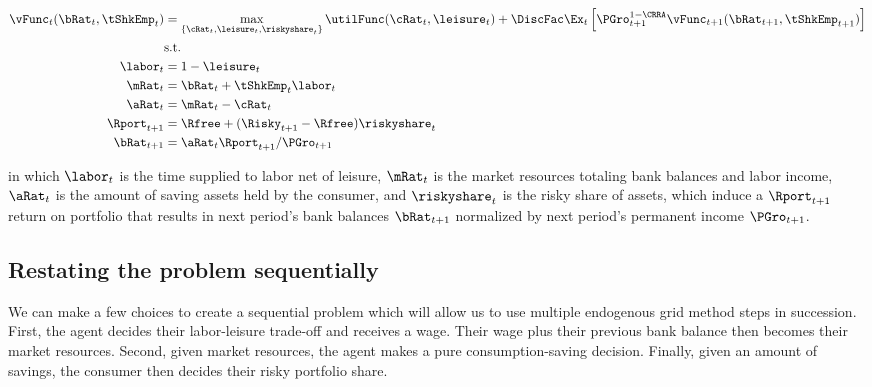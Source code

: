 \documentclass[\econtexRoot/SequentialEGM]{subfiles}
\begin{document}
\begin{equation}
	\begin{split}
		\vFunc_{t}(\bRat_{t}, \tShkEmp_{t}) & = \max_{\{\cRat_{t},
			\leisure_{t}, \riskyshare_{t}\}} \utilFunc(\cRat_{t}, \leisure_{t}) +
		\DiscFac \Ex_{t} \left[ \PGro_{t+1}^{1-\CRRA}
			\vFunc_{t+1} (\bRat_{t+1},
			\tShkEmp_{t+1}) \right] \\
		& \text{s.t.} \\
		\labor_{t} & = 1 - \leisure_{t} \\
		\mRat_{t} & = \bRat_{t} + \tShkEmp_{t}\labor_{t} \\
		\aRat_{t} & = \mRat_{t} - \cRat_{t} \\
		\Rport_{t+1} & = \Rfree + (\Risky_{t+1} - \Rfree)
		\riskyshare_{t} \\
		\bRat_{t+1} & = \aRat_{t} \Rport_{t+1} / \PGro_{t+1}
	\end{split}
\end{equation}

in which $\labor_{t}$ is the time supplied to labor net of leisure, $\mRat_{t}$ is the market resources totaling bank balances and labor income, $\aRat_{t}$ is the amount of saving assets held by the consumer, and $\riskyshare_{t}$ is the risky share of assets, which induce a $\Rport_{t+1}$ return on portfolio that results in next period's bank balances $\bRat_{t+1}$ normalized by next period's permanent income $\PGro_{t+1}$.


\subsection{Restating the problem sequentially}

We can make a few choices to create a sequential problem which will allow us to use multiple endogenous grid method steps in succession. First, the
agent decides their labor-leisure trade-off and receives a wage. Their wage
plus their previous bank balance then becomes their market resources. Second, given
market resources, the agent makes a pure consumption-saving decision. Finally, given an amount of savings, the consumer then decides their risky portfolio share.
\end{document}
